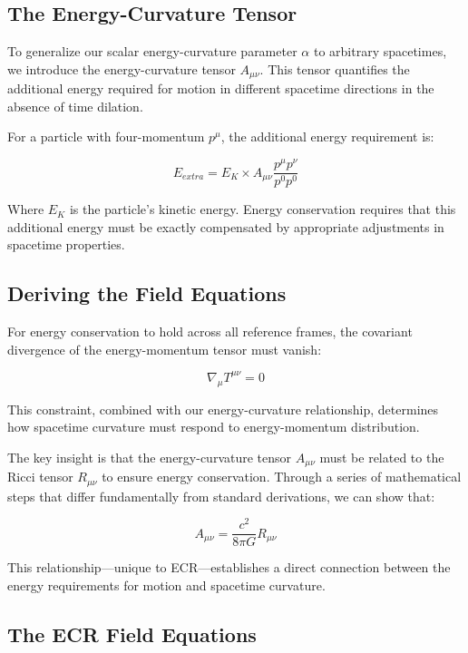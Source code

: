 \documentclass[11pt,a4paper]{article}
\begin{document}
\subsection{The Energy-Curvature Tensor}
To generalize our scalar energy-curvature parameter $\alpha$ to arbitrary spacetimes, we introduce the energy-curvature tensor $A_{\mu\nu}$. This tensor quantifies the additional energy required for motion in different spacetime directions in the absence of time dilation.

For a particle with four-momentum $p^\mu$, the additional energy requirement is:

\begin{equation}
    E_{extra} = E_K \times A_{\mu\nu}\frac{p^\mu p^\nu}{p^0 p^0}
\end{equation}

Where $E_K$ is the particle's kinetic energy. Energy conservation requires that this additional energy must be exactly compensated by appropriate adjustments in spacetime properties.

\subsection{Deriving the Field Equations}

For energy conservation to hold across all reference frames, the covariant divergence of the energy-momentum tensor must vanish:

\begin{equation}
    \nabla_\mu T^{\mu\nu} = 0
\end{equation}

This constraint, combined with our energy-curvature relationship, determines how spacetime curvature must respond to energy-momentum distribution.

The key insight is that the energy-curvature tensor $A_{\mu\nu}$ must be related to the Ricci tensor $R_{\mu\nu}$ to ensure energy conservation. Through a series of mathematical steps that differ fundamentally from standard derivations, we can show that:

\begin{equation}
    A_{\mu\nu} = \frac{c^2}{8\pi G}R_{\mu\nu}
\end{equation}

This relationship—unique to ECR—establishes a direct connection between the energy requirements for motion and spacetime curvature.

\subsection{The ECR Field Equations}
\end{document}
